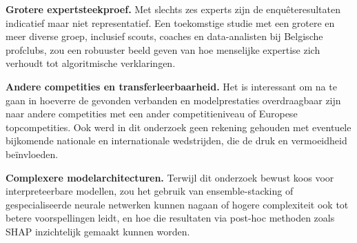 \textbf{Grotere expertsteekproef.} Met slechts zes experts zijn de enquêteresultaten indicatief maar niet representatief.
Een toekomstige studie met een grotere en meer diverse groep, inclusief scouts, coaches en data-analisten
bij Belgische profclubs, zou een robuuster beeld geven van hoe menselijke expertise zich verhoudt tot algoritmische verklaringen.

\vspace{5pt}

\textbf{Andere competities en transferleerbaarheid.} Het is interessant om na te gaan in hoeverre de gevonden
verbanden en modelprestaties overdraagbaar zijn naar andere competities met een ander competitieniveau of Europese topcompetities.
Ook werd in dit onderzoek geen rekening gehouden met eventuele bijkomende nationale en internationale wedstrijden, die de druk en vermoeidheid beïnvloeden.

\vspace{5pt}

\textbf{Complexere modelarchitecturen.} Terwijl dit onderzoek bewust koos voor interpreteerbare modellen,
zou het gebruik van ensemble-stacking of gespecialiseerde neurale netwerken kunnen nagaan
of hogere complexiteit ook tot betere voorspellingen leidt, en hoe die resultaten via post-hoc methoden
zoals SHAP inzichtelijk gemaakt kunnen worden.